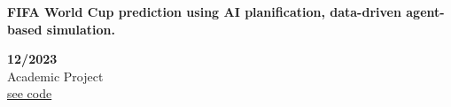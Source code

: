 \begin{minipage}{0.8\textwidth}
    \parbox{0.8\linewidth}{\textbf{FIFA World Cup prediction using AI planification, data-driven agent-based simulation.}}  \hfill  \textbf{12/2023}\\
    Academic Project\\
    \href{https://github.com/geeksLabTech/FIFA_World_Cup_2022}{see code}\\
    \end{minipage} \hfill {}\\\\